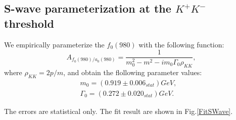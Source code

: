\subsection{S-wave parameterization at the $K^{+}K^{-}$ threshold}
\par{We empirically parameterize the $f_{0}(980)$ with the following function:
    \begin{equation}
        A_{f_{0}(980) / a_{0}(980)} = \frac{1}{m_{0}^{2} - m^{2} -im_{0}\Gamma_{0}\rho_{KK}}, \label{a0980-RBW}
    \end{equation}
    where $\rho_{KK} = 2p/m$, and obtain the flollowing parameter values:
    \begin{equation}
        \begin{array}{lr}
            m_{0} = (0.919 \pm 0.006_{stat}) GeV, &\\
            \Gamma_{0} = (0.272 \pm 0.020_{stat}) GeV. &
        \end{array}\label{S-wave parameters} 
    \end{equation}


    The errors are statistical only. The fit result are shown in Fig.\ref{FitSWave}.
    
}

